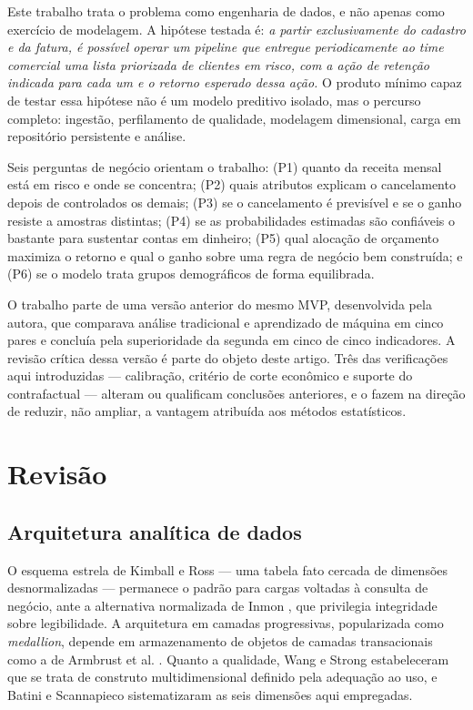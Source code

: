 \documentclass[10pt,a4paper]{article}
\begin{document}
Este trabalho trata o problema como engenharia de dados, e não apenas como exercício de
modelagem. A hipótese testada é: \emph{a partir exclusivamente do cadastro e da fatura, é
possível operar um pipeline que entregue periodicamente ao time comercial uma lista
priorizada de clientes em risco, com a ação de retenção indicada para cada um e o retorno
esperado dessa ação.} O produto mínimo capaz de testar essa hipótese não é um modelo
preditivo isolado, mas o percurso completo: ingestão, perfilamento de qualidade,
modelagem dimensional, carga em repositório persistente e análise.

Seis perguntas de negócio orientam o trabalho: (P1) quanto da receita mensal está em
risco e onde se concentra; (P2) quais atributos explicam o cancelamento depois de
controlados os demais; (P3) se o cancelamento é previsível e se o ganho resiste a
amostras distintas; (P4) se as probabilidades estimadas são confiáveis o bastante para
sustentar contas em dinheiro; (P5) qual alocação de orçamento maximiza o retorno e qual o
ganho sobre uma regra de negócio bem construída; e (P6) se o modelo trata grupos
demográficos de forma equilibrada.

O trabalho parte de uma versão anterior do mesmo MVP, desenvolvida pela autora, que
comparava análise tradicional e aprendizado de máquina em cinco pares e concluía pela
superioridade da segunda em cinco de cinco indicadores. A revisão crítica dessa versão é
parte do objeto deste artigo. Três das verificações aqui introduzidas --- calibração,
critério de corte econômico e suporte do contrafactual --- alteram ou qualificam
conclusões anteriores, e o fazem na direção de reduzir, não ampliar, a vantagem atribuída
aos métodos estatísticos.

\section{Revisão}

\subsection{Arquitetura analítica de dados}

O esquema estrela de Kimball e Ross \cite{kimball} --- uma tabela fato cercada de dimensões
desnormalizadas --- permanece o padrão para cargas voltadas à consulta de negócio, ante a
alternativa normalizada de Inmon \cite{inmon}, que privilegia integridade sobre legibilidade.
A arquitetura em camadas progressivas, popularizada como \emph{medallion}, depende em
armazenamento de objetos de camadas transacionais como a de Armbrust et al. \cite{armbrust}.
Quanto a qualidade, Wang e Strong \cite{wang} estabeleceram que se trata de construto
multidimensional definido pela adequação ao uso, e Batini e Scannapieco \cite{batini}
sistematizaram as seis dimensões aqui empregadas.
\end{document}
